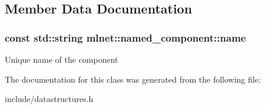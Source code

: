 \subsection{Member Data Documentation}
\hypertarget{classmlnet_1_1named__component_a3015f6650729352abae8fb01e7ee7ca7}{
\subsubsection[{name}]{\setlength{\rightskip}{0pt plus 5cm}const std\+::string mlnet\+::named\+\_\+component\+::name}}\label{classmlnet_1_1named__component_a3015f6650729352abae8fb01e7ee7ca7}
Unique name of the component 

The documentation for this class was generated from the following file\+:\begin{DoxyCompactItemize}
\item 
include/datastructures.\+h\end{DoxyCompactItemize}
